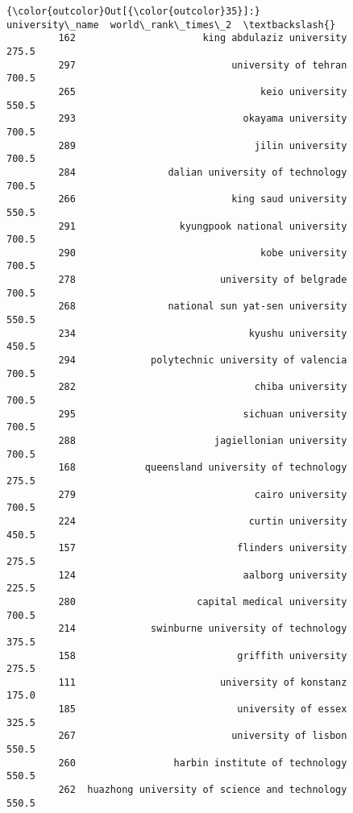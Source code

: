 \documentclass[11pt]{article}
\begin{document}
\begin{Verbatim}[commandchars=\\\{\}]
{\color{outcolor}Out[{\color{outcolor}35}]:}                                    university\_name  world\_rank\_times\_2  \textbackslash{}
         162                      king abdulaziz university               275.5   
         297                           university of tehran               700.5   
         265                                keio university               550.5   
         293                             okayama university               700.5   
         289                               jilin university               700.5   
         284                dalian university of technology               700.5   
         266                           king saud university               550.5   
         291                  kyungpook national university               700.5   
         290                                kobe university               700.5   
         278                         university of belgrade               700.5   
         268                national sun yat-sen university               550.5   
         234                              kyushu university               450.5   
         294             polytechnic university of valencia               700.5   
         282                               chiba university               700.5   
         295                             sichuan university               700.5   
         288                        jagiellonian university               700.5   
         168            queensland university of technology               275.5   
         279                               cairo university               700.5   
         224                              curtin university               450.5   
         157                            flinders university               275.5   
         124                             aalborg university               225.5   
         280                     capital medical university               700.5   
         214             swinburne university of technology               375.5   
         158                            griffith university               275.5   
         111                         university of konstanz               175.0   
         185                            university of essex               325.5   
         267                           university of lisbon               550.5   
         260                 harbin institute of technology               550.5   
         262  huazhong university of science and technology               550.5   

\end{Verbatim}
\end{document}

